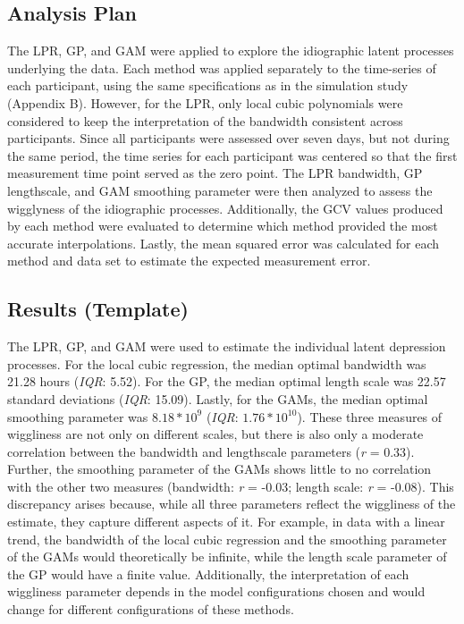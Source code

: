 \documentclass[man, floatsintext]{apa7}
\begin{document}
\subsection{Analysis Plan}

The LPR, GP, and GAM were applied to explore the idiographic latent processes
underlying the data. Each method was applied separately to the time-series of
each participant, using the same specifications as in the simulation study
(Appendix B). However, for the LPR, only local cubic polynomials were
considered to keep the interpretation of the bandwidth consistent across
participants. Since all participants were assessed over seven days, but not
during the same period, the time series for each participant was centered so
that the first measurement time point served as the zero point. The LPR
bandwidth, GP lengthscale, and GAM smoothing parameter were then analyzed to
assess the wigglyness of the idiographic processes. Additionally, the GCV
values produced by each method were evaluated to determine which method
provided the most accurate interpolations. Lastly, the mean squared error was
calculated for each method and data set to estimate the expected measurement
error.

\subsection{Results (Template)}

The LPR, GP, and GAM were used to estimate the individual latent depression
processes. For the local cubic regression, the median optimal bandwidth was
21.28 hours (\textit{IQR}: 5.52). For the GP, the median optimal length scale
was 22.57 standard deviations (\textit{IQR}: 15.09). Lastly, for the GAMs, the
median optimal smoothing parameter was $8.18*10^9$ (\textit{IQR}:
$1.76*10^{10}$). These three measures of wiggliness are not only on different
scales, but there is also only a moderate correlation between the bandwidth and
lengthscale parameters (\textit{r} = 0.33). Further, the smoothing parameter of
the GAMs shows little to no correlation with the other two measures (bandwidth:
\textit{r} = -0.03; length scale: \textit{r} = -0.08). This discrepancy arises
because, while all three parameters reflect the wiggliness of the estimate,
they capture different aspects of it. For example, in data with a linear trend,
the bandwidth of the local cubic regression and the smoothing parameter of the
GAMs would theoretically be infinite, while the length scale parameter of the
GP would have a finite value. Additionally, the interpretation of each
wiggliness parameter depends in the model configurations chosen and would
change for different configurations of these methods.
\end{document}
